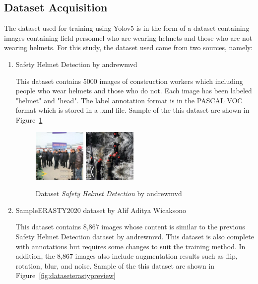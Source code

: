 \subsection{Dataset Acquisition}
\label{subsec:DatasetAcquisition}

\par The dataset used for training using Yolov5 is in the form of a dataset containing images containing field personnel who are wearing helmets and those who are not wearing helmets. For this study, the dataset used came from two sources, namely:

\begin{enumerate}
  \item Safety Helmet Detection by andrewmvd
  \par This dataset contains 5000 images of construction workers which including people who wear helmets and those who do not.  Each image has been labeled "helmet" and "head". The label annotation format is in the PASCAL VOC format which is stored in a .xml file. Sample of the this dataset are shown in Figure~\ref{fig:datasethelmetdetectionpreview}

  \begin{figure}[ht]
    \centering
    \includegraphics[width=0.24\textwidth]{gambar/sample_kaggle1/hard_hat_workers0.png}
    \includegraphics[width=0.24\textwidth]{gambar/sample_kaggle1/hard_hat_workers1.png}
    \caption{Dataset \emph{Safety Helmet Detection} by andrewmvd}
    \label{fig:datasethelmetdetectionpreview}  
  \end{figure}

  \item SampleERASTY2020 dataset by Alif Aditya Wicaksono
  \par This dataset contains 8,867 images whose content is similar to the previous Safety Helmet Detection dataset by andrewmvd. This dataset is also complete with annotations but requires some changes to suit the training method. In addition, the 8,867 images also include augmentation results such as flip, rotation, blur, and noise. Sample of the this dataset are shown in Figure~\ref{fig:dataseterastypreview}


\end{enumerate}
